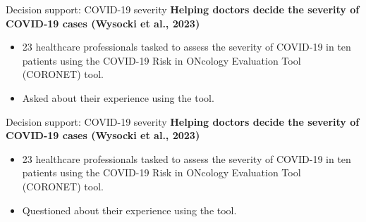 \documentclass[8pt]{beamer}
\begin{document}
	\begin{frame}[t]{Decision support: COVID-19 severity}
		\textbf{Helping doctors decide the severity of COVID-19 cases (Wysocki et al., 2023)}\\
		\begin{itemize}
			\item 23 healthcare professionals tasked to assess the severity of COVID-19 in ten patients using the COVID-19 Risk in ONcology Evaluation Tool (CORONET) tool.
			\item Asked about their experience using the tool.
		\end{itemize}
		\vspace{0.5cm}
		\centering
	\end{frame}

	\begin{frame}[t]{Decision support: COVID-19 severity} %
		\textbf{Helping doctors decide the severity of COVID-19 cases (Wysocki et al., 2023)}\\
		\begin{itemize}
			\item 23 healthcare professionals tasked to assess the severity of COVID-19 in ten patients using the COVID-19 Risk in ONcology Evaluation Tool (CORONET) tool.
			\item Questioned about their experience using the tool.
		\end{itemize}
		\vspace{0.5cm}
		\centering
	\end{frame}
\end{document}
